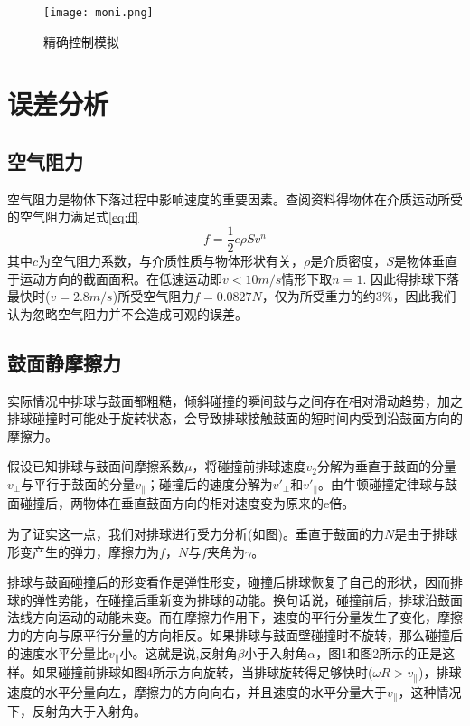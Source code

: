 \documentclass[withoutpreface,bwprint]{cumcmthesis} %
\begin{document}
\begin{figure}[h]
	\centering
	\texttt{[image: moni.png]}
	\caption{精确控制模拟}
	\label{fig:moni}
\end{figure}

\section{误差分析}

\subsection{空气阻力}
空气阻力是物体下落过程中影响速度的重要因素。查阅资料得物体在介质运动所受的空气阻力满足式\ref{eq:ff}
\begin{equation}
	f=\frac{1}{2}c\rho Sv^n
	\label{eq:ff}
\end{equation}
其中$c$为空气阻力系数，与介质性质与物体形状有关，$\rho$是介质密度，$S$是物体垂直于运动方向的截面面积。在低速运动即$v<10m/s$情形下取$n=1$. 因此得排球下落最快时($v=2.8m/s$)所受空气阻力$f=0.0827N$，仅为所受重力的约$3\%$，因此我们认为忽略空气阻力并不会造成可观的误差。

\subsection{鼓面静摩擦力}
实际情况中排球与鼓面都粗糙，倾斜碰撞的瞬间鼓与之间存在相对滑动趋势，加之排球碰撞时可能处于旋转状态，会导致排球接触鼓面的短时间内受到沿鼓面方向的摩擦力。

假设已知排球与鼓面间摩擦系数$\mu$，将碰撞前排球速度$v_2$分解为垂直于鼓面的分量$v_\bot$与平行于鼓面的分量$v_\parallel$；碰撞后的速度分解为$v'_\bot$和$v'_\parallel$。由牛顿碰撞定律球与鼓面碰撞后，两物体在垂直鼓面方向的相对速度变为原来的e倍。

为了证实这一点，我们对排球进行受力分析(如图)。垂直于鼓面的力$N$是由于排球形变产生的弹力，摩擦力为$f$，$N$与$f$夹角为$\gamma$。

排球与鼓面碰撞后的形变看作是弹性形变，碰撞后排球恢复了自己的形状，因而排球的弹性势能，在碰撞后重新变为排球的动能。换句话说，碰撞前后，排球沿鼓面法线方向运动的动能未变。而在摩擦力作用下，速度的平行分量发生了变化，摩擦力的方向与原平行分量的方向相反。如果排球与鼓面壁碰撞时不旋转，那么碰撞后的速度水平分量比$v_\parallel$小。这就是说,反射角$\beta$小于入射角$\alpha$，图1和图2所示的正是这样。如果碰撞前排球如图4所示方向旋转，当排球旋转得足够快时($\omega R>v_\parallel$)，排球速度的水平分量向左，摩擦力的方向向右，并且速度的水平分量大于$v_\parallel$，这种情况下，反射角大于入射角。
\end{document}

